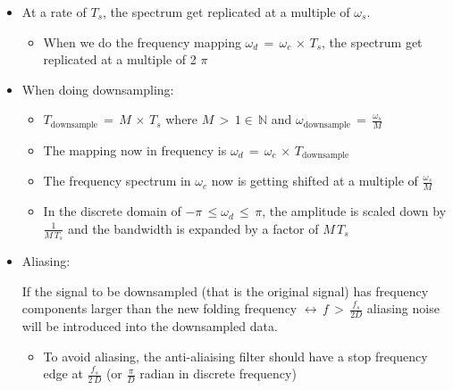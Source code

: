\documentclass[12pt,a4paper]{book}
\begin{document}
\begin{itemize}

\item At a rate of $T_s$, the spectrum get replicated at a multiple of $\omega_s$.

	\begin{itemize}
	\item When we do the frequency mapping $\omega_d \, = \, \omega_c \, \times \, T_s$, the spectrum get replicated at a multiple of 2 $\pi$
	
	
	
	\end{itemize}

\item When doing downsampling:

	\begin{itemize}
	\item $T_{\text{downsample}} \, = \, M \, \times \, T_s$ where $M \, > \, 1 \in \, \mathbb{N}$ and $\omega_{\text{downsample}} \,= \, \displaystyle\frac{\omega_s}{M}$
	
	
	\item The mapping now in frequency is $\omega_d \, = \, \omega_c \, \times \, T_{\text{downsample}}$
	
	
	\item The frequency spectrum in $\omega_c$ now is getting shifted at a multiple of $\displaystyle\frac{\omega_s}{M} $
	
	
	\item In the discrete domain of $-  \pi \, \leq\omega_d \, \leq \,  \pi$, the amplitude is scaled down by $\displaystyle\frac{1}{M \, T_s}$ and the bandwidth is expanded by a factor of $M \, T_s$
	\end{itemize}


\item Aliasing:

If the signal to be downsampled (that is the original signal) has frequency components larger than the new folding frequency $ \leftrightarrow \, f \, > \, \displaystyle\frac{f_s}{2 D}$
aliasing noise will be introduced into the downsampled data.


    \begin{itemize}
        \item To avoid aliasing, the anti-aliaising filter should have a stop frequency edge at $\displaystyle\frac{f_s}{2 \, D}$ (or $\displaystyle\frac{\pi}{D}$ radian in discrete frequency)
    \end{itemize}





\end{itemize}
\end{document}
